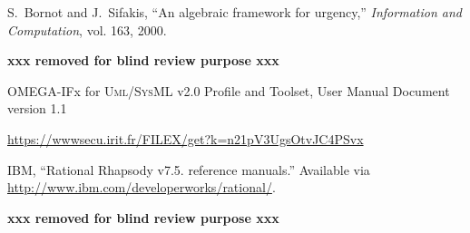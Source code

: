 \documentclass[a4paper,twoside]{article}
\def\sysml{\textsc{SysML}}
\def\uml{\textsc{Uml}}
\newcommand{\final}[1]{\textbf{xxx removed for blind review purpose xxx}}
\begin{document}
\begin{thebibliography}{1}
S.~Bornot and J.~Sifakis, ``{An algebraic framework for urgency},'' \emph{Information and Computation}, vol. 163, 2000.

\final{M.~Bozga, S.~Graf, I.~Ober, I.~Ober, and J.~Sifakis, ``{The IF Toolset},'' in   \emph{Formal Methods for the Design of Real-Time Systems}, ser. Lecture Notes in Computer Science, M.~Bernardo and F.~Corradini, Eds.\hskip 1em plus 0.5em minus 0.4em\relax Springer Berlin / Heidelberg, 2004, vol. 3185, pp. 131--132.}

 OMEGA-IFx for \uml{}/\sysml{} v2.0 Profile and Toolset, User Manual Document version 1.1

 \url{https://wwwsecu.irit.fr/FILEX/get?k=n21pV3UgsOtvJC4PSvx}

  IBM, “Rational Rhapsody v7.5. reference manuals.” Available via \url{http://www.ibm.com/developerworks/rational/}.

 \final{Jean-Michel Bruel, Nicolas Belloir and Manzoor Ahmad. SPAS: un proﬁl \sysml{} pour les systèmes auto-adaptatifs, In 15ème Colloque National de la Recherche en IUT (CNRIUT), Lille, June 8th to June 9th, 2009.}





\end{thebibliography}

%
\vfill
\end{document}
